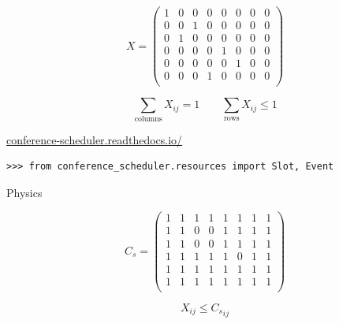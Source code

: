 \documentclass{beamer}
\begin{document}
    \begin{frame}
        \Large
        \[
            X = 
            \begin{pmatrix}
                1 & 0 & 0 & 0 & 0 & 0 & 0 & 0\\
                0 & 0 & 1 & 0 & 0 & 0 & 0 & 0\\
                0 & 1 & 0 & 0 & 0 & 0 & 0 & 0\\
                0 & 0 & 0 & 0 & 1 & 0 & 0 & 0\\
                0 & 0 & 0 & 0 & 0 & 1 & 0 & 0\\
                0 & 0 & 0 & 1 & 0 & 0 & 0 & 0\\
            \end{pmatrix}
        \]

        \[
           \sum_{\text{columns}}X_{ij} = 1 \qquad
           \sum_{\text{rows}}X_{ij} \leq 1
        \]
    \end{frame}

    \begin{frame}
        \Large
        \begin{center}
            \href{http://conference-scheduler.readthedocs.io/}
                 {conference-scheduler.readthedocs.io/}
        \end{center}
    \end{frame}

    \begin{frame}[fragile]{}
        \begin{verbatim}
>>> from conference_scheduler.resources import Slot, Event
        \end{verbatim}
\end{frame}

    \begin{frame}
        \Huge
        \begin{center}
            Physics
        \end{center}
    \end{frame}

    \begin{frame}
        \Large  
        \[
            C_s = 
            \begin{pmatrix}
                1 & 1 & 1 & 1 & 1 & 1 & 1 & 1 \\
                1 & 1 & 0 & 0 & 1 & 1 & 1 & 1\\
                1 & 1 & 0 & 0 & 1 & 1 & 1 & 1\\
                1 & 1 & 1 & 1 & 1 & 0 & 1 & 1\\
                1 & 1 & 1 & 1 & 1 & 1 & 1 & 1\\
                1 & 1 & 1 & 1 & 1 & 1 & 1 & 1\\
            \end{pmatrix}
        \]

        \[
        X_{ij} \leq {C_{s}}_{ij}
        \]
    \end{frame}
\end{document}
